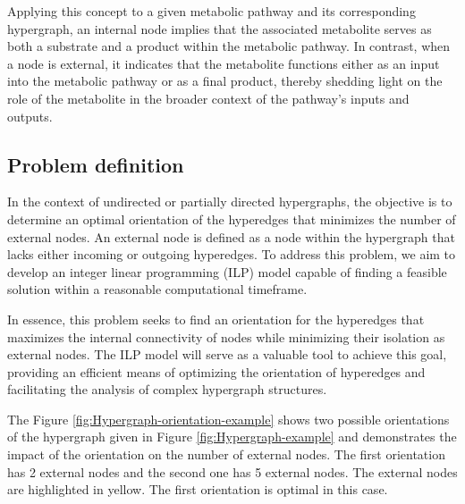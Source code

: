 Applying this concept to a given metabolic pathway and its corresponding hypergraph, an internal node implies that the associated metabolite serves as both a substrate and a product within the metabolic pathway. In contrast, when a node is external, it indicates that the metabolite functions either as an input into the metabolic pathway or as a final product, thereby shedding light on the role of the metabolite in the broader context of the pathway's inputs and outputs.

\subsection{Problem definition}

In the context of undirected or partially directed hypergraphs, the objective is to determine an optimal orientation of the hyperedges that minimizes the number of external nodes. An external node is defined as a node within the hypergraph that lacks either incoming or outgoing hyperedges. To address this problem, we aim to develop an integer linear programming (ILP) model capable of finding a feasible solution within a reasonable computational timeframe.

In essence, this problem seeks to find an orientation for the hyperedges that maximizes the internal connectivity of nodes while minimizing their isolation as external nodes. The ILP model will serve as a valuable tool to achieve this goal, providing an efficient means of optimizing the orientation of hyperedges and facilitating the analysis of complex hypergraph structures.

The Figure \ref{fig:Hypergraph-orientation-example} shows two possible orientations of the hypergraph given in Figure \ref{fig:Hypergraph-example} and demonstrates the impact of the orientation on the number of external nodes.
The first orientation has 2 external nodes and the second one has 5 external nodes. The external nodes are highlighted in yellow. The first orientation is optimal in this case.

